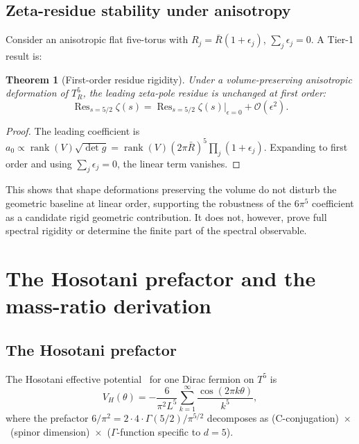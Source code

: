 \documentclass[11pt,a4paper]{article}
\newtheorem{theorem}{Theorem}
\theoremstyle{definition}
\theoremstyle{remark}
\begin{document}
\subsection{Zeta-residue stability under anisotropy}

Consider an anisotropic flat five-torus with $R_j=\bar{R}(1+\epsilon_j)$,
$\sum_j\epsilon_j=0$.  A Tier-1 result is:

\begin{theorem}[First-order residue rigidity]\label{thm:anisotropy}
Under a volume-preserving anisotropic deformation of $T^5_R$, the
leading zeta-pole residue is unchanged at first order:
\begin{equation}
  \operatorname{Res}_{s=5/2}\zeta(s)
  = \operatorname{Res}_{s=5/2}\zeta(s)\big|_{\epsilon=0}
    + \mathcal{O}(\epsilon^2).
\end{equation}
\end{theorem}

\begin{proof}
The leading coefficient is $a_0\propto\operatorname{rank}(V)\sqrt{\det g}
=\operatorname{rank}(V)(2\pi\bar{R})^5\prod_j(1+\epsilon_j)$.  Expanding
to first order and using $\sum_j\epsilon_j=0$, the linear term vanishes.
\end{proof}

This shows that shape deformations preserving the volume do not disturb
the geometric baseline at linear order, supporting the robustness of the
$6\pi^5$ coefficient as a candidate rigid geometric contribution.  It
does not, however, prove full spectral rigidity or determine the finite
part of the spectral observable.

\section{The Hosotani prefactor and the mass-ratio derivation}
\label{sec:V1}

\subsection{The Hosotani prefactor}

The Hosotani effective potential~\cite{Hosotani1983} for one Dirac
fermion on $T^5$ is
\begin{equation}\label{eq:hosotani}
  V_H(\theta) = -\frac{6}{\pi^2 L^5}\sum_{k=1}^\infty
    \frac{\cos(2\pi k\theta)}{k^5},
\end{equation}
where the prefactor $6/\pi^2=2\cdot 4\cdot\Gamma(5/2)/\pi^{5/2}$
decomposes as (C-conjugation)~$\times$~(spinor dimension)~$\times$~($\Gamma$-function
specific to $d=5$).
\end{document}
